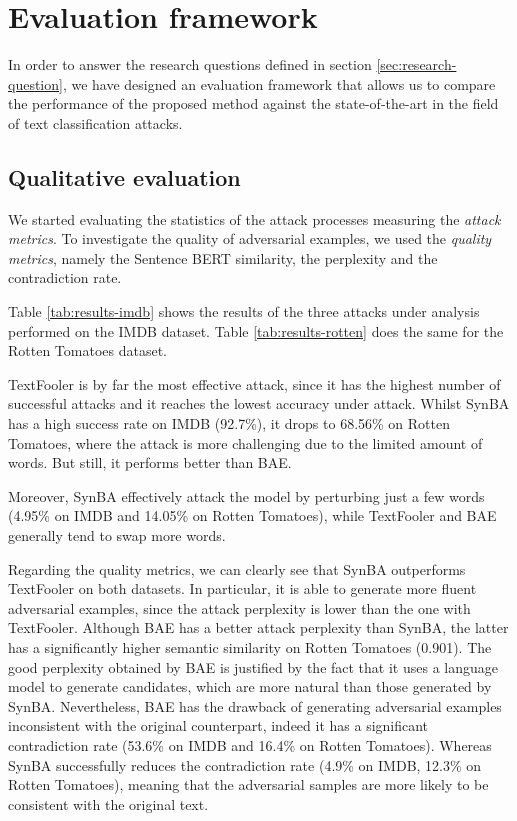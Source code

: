 \section{Evaluation framework}\label{sec:evaluation-framework}

In order to answer the research questions defined in section \ref{sec:research-question},
we have designed an evaluation framework that allows us to compare the performance of the proposed method against the state-of-the-art in the field of text classification attacks.


\subsection{Qualitative evaluation}\label{subsec:qualitative-evaluation}

We started evaluating the statistics of the attack processes measuring the \emph{attack metrics}.
To investigate the quality of adversarial examples, we used the \emph{quality metrics}, namely the Sentence BERT similarity, the perplexity and the contradiction rate.

Table \ref{tab:results-imdb} shows the results of the three attacks under analysis performed on the IMDB dataset.
Table \ref{tab:results-rotten} does the same for the Rotten Tomatoes dataset.

TextFooler is by far the most effective attack, since it has the highest number of successful attacks and it reaches the lowest accuracy under attack.
Whilst SynBA has a high success rate on IMDB (92.7\%), it drops to 68.56\% on Rotten Tomatoes, where the attack is more challenging due to the limited amount of words.
But still, it performs better than BAE.

Moreover, SynBA effectively attack the model by perturbing just a few words (4.95\% on IMDB and 14.05\% on Rotten Tomatoes), while TextFooler and BAE generally tend to swap more words.

Regarding the quality metrics, we can clearly see that SynBA outperforms TextFooler on both datasets. 
In particular, it is able to generate more fluent adversarial examples, since the attack perplexity is lower than the one with TextFooler. 
Although BAE has a better attack perplexity than SynBA, the latter has a significantly higher semantic similarity on Rotten Tomatoes (0.901).
The good perplexity obtained by BAE is justified by the fact that it uses a language model to generate candidates, which are more natural than those generated by SynBA.
Nevertheless, BAE has the drawback of generating adversarial examples inconsistent with the original counterpart, indeed it has a significant contradiction rate (53.6\% on IMDB and 16.4\% on Rotten Tomatoes).
Whereas SynBA successfully reduces the contradiction rate (4.9\% on IMDB, 12.3\% on Rotten Tomatoes), meaning that the adversarial samples are more likely to be consistent with the original text.

